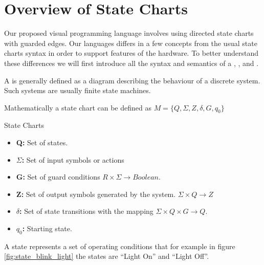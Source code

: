 \section{Overview of State Charts} \label{sec:overviewstatechart}

Our proposed visual programming language involves using directed state charts with guarded edges. Our languages differs in a few concepts from the usual state charts syntax in order to support features of the hardware. To better understand these differences we will first introduce all the syntax and semantics of a \cite{StateChartVis}, \cite{UML2}, and \cite{UML2}.

A \cite{StateChartVis} is generally defined as a diagram describing the behaviour of a discrete system. Such systems are usually finite state machines. 

Mathematically a state chart can be defined as $M = \lbrace Q, \Sigma, Z, \delta, G, q_0\rbrace$

\begin{definition}
State Charts

\label{def:statecharts}
\begin{itemize}
	\item \textbf{Q:} Set of states.
	\item \textbf{$\Sigma$:} Set of input symbols or actions
	\item \textbf{G:} Set of guard conditions $R \times \Sigma \rightarrow Boolean$.
	\item \textbf{Z:} Set of output symbols generated by the system. $\Sigma \times Q \rightarrow Z$
	\item \textbf{$\delta$:} Set of state transitions with the mapping $\Sigma \times Q \times G \rightarrow Q$. 
	\item \textbf{$q_0$:} Starting state.
\end{itemize}
\end{definition}

A state represents a set of operating conditions that for example in figure \ref{fig:state_blink_light} the states are ``Light On'' and ``Light Off''.

